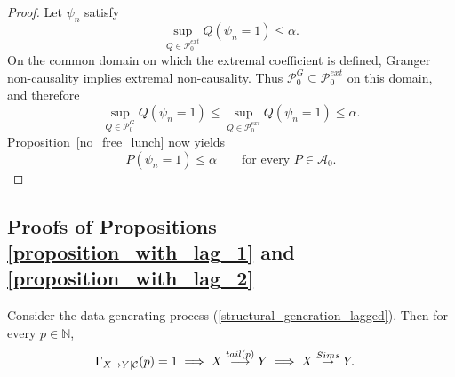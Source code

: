 \documentclass[a4paper,11pt]{article}
\newenvironment{customprop}[1]
  {\renewcommand\theinnercustomprop{#1}\innercustomprop}
  {\endinnercustomprop}
\newcommand{\toverset}[2]{\overset{{\rm #1}}{#2}}
\begin{document}
\begin{proof}
Let \(\psi_n\) satisfy
\[
    \sup_{Q\in\mathcal P_0^{ext}}Q(\psi_n=1)\le \alpha .
\]
On the common domain on which the extremal coefficient is defined, Granger
non-causality implies extremal non-causality. Thus
\(\mathcal P_0^G\subseteq\mathcal P_0^{ext}\) on this domain, and therefore
\[
    \sup_{Q\in\mathcal P_0^G}Q(\psi_n=1)
    \le
    \sup_{Q\in\mathcal P_0^{ext}}Q(\psi_n=1)
    \le \alpha .
\]
Proposition~\ref{no_free_lunch} now yields
\[
    P(\psi_n=1)\le \alpha
    \qquad
    \text{for every }P\in\mathcal A_0 .
\]
\end{proof}

\newpage
\subsection{Proofs of Propositions \ref{proposition_with_lag_1} and \ref{proposition_with_lag_2}} 
\label{proof_of_proposition_with_lag}

\begin{customprop}{\ref{proposition_with_lag_1}}
Consider the data-generating process (\ref{structural_generation_lagged}). Then for every $p\in\mathbb{N}$, 
\begin{equation*}
    \begin{split}
     \Gamma_{\textbf{X}\to\textbf{Y}\mid\mathcal{C}}(p) = 1 &\implies \textbf{X}\overset{{\rm tail}(p)}{\longrightarrow}\textbf{Y}    
    \implies \textbf{X}\toverset{Sims}{\to}\textbf{Y}.  
    \end{split}
\end{equation*}
\end{customprop}
\end{document}
